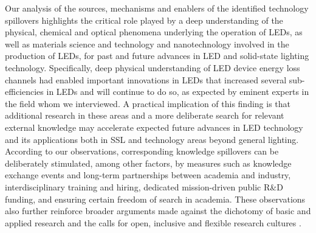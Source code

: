 \documentclass[parskip=full]{article}
\begin{document}
Our analysis of the sources, mechanisms and enablers of the identified technology spillovers highlights the critical role played by a deep understanding of the physical, chemical and optical phenomena underlying the operation of LEDs, as well as materials science and technology and nanotechnology involved in the production of LEDs, for past and future advances in LED and solid-state lighting technology. Specifically, deep physical understanding of LED device energy loss channels had enabled important innovations in LEDs that increased several sub-efficiencies in LEDs and will continue to do so, as expected by eminent experts in the field whom we interviewed. A practical implication of this finding is that additional research in these areas and a more deliberate search for relevant external knowledge may accelerate expected future advances in LED technology and its applications both in SSL and technology areas beyond general lighting. According to our observations, corresponding knowledge spillovers can be deliberately stimulated, among other factors, by measures such as knowledge exchange events and long-term partnerships between academia and industry, interdisciplinary training and hiring, dedicated mission-driven public R\&D funding, and ensuring certain freedom of search in academia. These observations also further reinforce broader arguments made against the dichotomy of basic and applied research \cite{narayanamurti2016cycles, narayanamurti2021genesis} and the calls for open, inclusive and flexible research cultures \cite{Stephan2021}.
\end{document}
